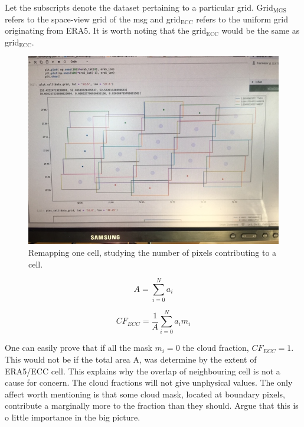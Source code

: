 Let the subscripts denote the dataset pertaining to a particular grid. Grid$_{\text{MGS}}$ refers to the space-view grid of the \acrlong{msg} and grid$_{\text{ECC}}$ refers to the uniform grid originating from ERA5. It is worth noting that the grid$_{\text{ECC}}$ would be the same as grid$_{\text{ECC}}$.
\begin{figure}
    \centering
    \includegraphics[scale = 0.6]{Chapter4_Results/figurs/remapping-pixels.JPG}
    \caption{Remapping one cell, studying the number of pixels contributing to a cell.}
    \label{fig:my_label}
\end{figure}

\begin{equation} \label{eq:tot_area}
    A = \sum_{i=0}^{N} a_i
\end{equation}

\begin{equation} \label{eq:area_weighting}
    CF_{ECC} = \frac{1}{A} \sum_{i=0}^{N} a_i m_i
\end{equation}

One can easily prove that if all the mask $m_i = 0$ the cloud fraction, $CF_{ECC}=1$. This would not be if the total area A, was determine by the extent of ERA5/ECC cell. This explains why the overlap of neighbouring cell is not a cause for concern. The cloud fractions will not give unphysical values. The only affect worth mentioning is that some cloud mask, located at boundary pixels, contribute a marginally more to the fraction than they should. Argue that this is o little importance in the big picture.

